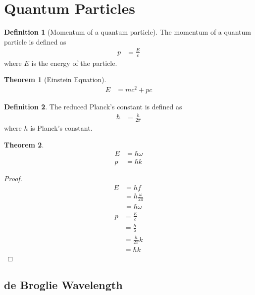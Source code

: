 \documentclass[titlepage, fleqn, a4paper, 12pt, twoside]{article}
\theoremstyle{definition}
\newtheorem{definition}{Definition}
\theoremstyle{theorem}
\newtheorem{theorem}{Theorem}
\begin{document}
\section{Quantum Particles}

\begin{definition}[Momentum of a quantum particle]
	The momentum of a quantum particle is defined as
	\begin{align*}
		p & = \frac{E}{c}
	\end{align*}
	where $E$ is the energy of the particle.
\end{definition}

\begin{theorem}[Einstein Equation]
	\begin{align*}
		E & = m c^2 + p c
	\end{align*}
	\label{Einstein_Equation}
\end{theorem}

\begin{definition}
	The reduced Planck's constant is defined as
	\begin{align*}
		\hbar & = \frac{h}{2 \pi}
	\end{align*}
	where $h$ is Planck's constant.
\end{definition}

\begin{theorem}
	\begin{align*}
		E & = \hbar \omega \\
		p & = \hbar k
	\end{align*}
\end{theorem}

\begin{proof}
	\begin{align*}
		E & = h f                    \\
                  & = h \frac{\omega}{2 \pi} \\
                  & = \hbar \omega
	\end{align*}
	\begin{align*}
		p & = \frac{E}{c}       \\
                  & = \frac{h}{\lambda} \\
                  & = \frac{h}{2 \pi} k \\
                  & = \hbar k
	\end{align*}
\end{proof}

\subsection{de Broglie Wavelength}
\end{document}
